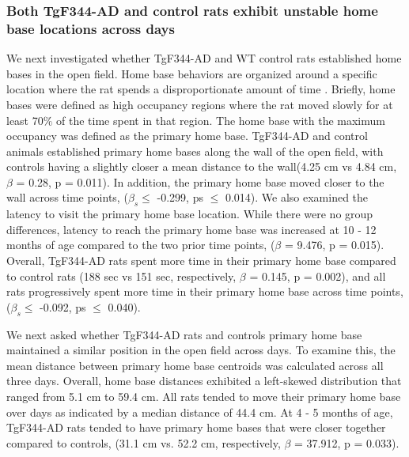 \documentclass[fleqn,10pt]{wlscirep}
\begin{document}
\subsubsection*{Both TgF344-AD and control rats exhibit unstable home base locations across days}
We next investigated whether TgF344-AD and WT control rats established home bases in the open field. Home base behaviors are organized around a specific location where the rat spends a disproportionate amount of time \cite{tchernichovski_part_nodate}. Briefly, home bases were defined as high occupancy regions where the rat moved slowly for at least 70$\%$ of the time spent in that region. The home base with the maximum occupancy was defined as the primary home base. TgF344-AD and control animals established primary home bases along the wall of the open field, with controls having a slightly closer a mean distance to the wall(4.25 cm vs 4.84 cm, $\beta$ = 0.28, p = 0.011). In addition, the primary home base moved closer to the wall across time points, ($\beta_s \leq$ -0.299, ps $\leq$ 0.014). We also examined the latency to visit the primary home base location. While there were no group differences, latency to reach the primary home base was increased at 10 - 12 months of age compared to the two prior time points, ($\beta$ = 9.476, p = 0.015). Overall, TgF344-AD rats spent more time in their primary home base compared to control rats (188 sec vs 151 sec, respectively, $\beta$ = 0.145, p = 0.002), and all rats progressively spent more time in their primary home base across time points, ($\beta_s \leq$ -0.092, ps $\leq$ 0.040). 

We next asked whether TgF344-AD rats and controls primary home base maintained a similar position in the open field across days. To examine this, the mean distance between primary home base centroids was calculated across all three days. Overall, home base distances exhibited a left-skewed distribution that ranged from 5.1 cm to 59.4 cm. All rats tended to move their primary home base over days as indicated by a median distance of 44.4 cm. At 4 - 5 months of age, TgF344-AD rats tended to have primary home bases that were closer together compared to controls, (31.1 cm vs. 52.2 cm, respectively, $\beta$ = 37.912, p = 0.033). 
\end{document}
